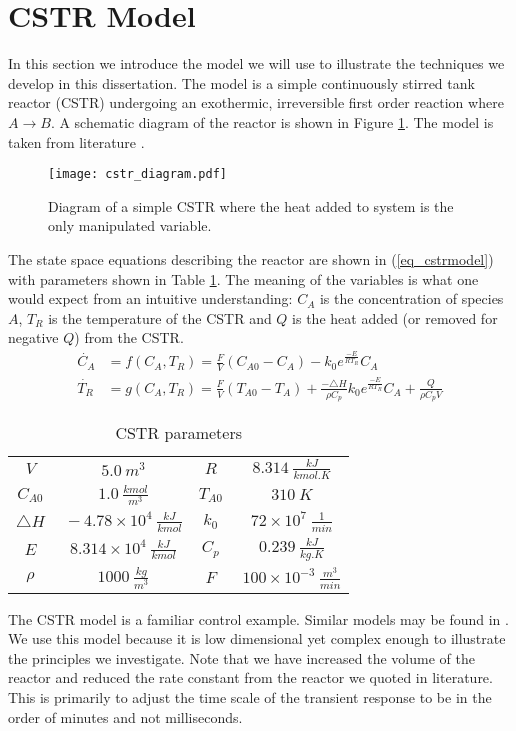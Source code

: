 \section{CSTR Model}
\label{sec_cstr}
In this section we introduce the model we will use to illustrate the techniques we develop in this dissertation. The model is a simple continuously stirred tank reactor (CSTR) undergoing an exothermic, irreversible first order reaction where $A \rightarrow B$. A schematic diagram of the reactor is shown in Figure \ref{fig_cstr_diagram}. The model is taken from literature \cite{cstrmodel}.
\begin{figure}[H] 
\centering
\texttt{[image: cstr\_diagram.pdf]}
\caption{Diagram of a simple CSTR where the heat added to system is the only manipulated variable.}
\label{fig_cstr_diagram}
\end{figure}
The state space equations describing the reactor are shown in (\ref{eq_cstrmodel}) with parameters shown in Table \ref{tab_params}. The meaning of the variables is what one would expect from an intuitive understanding: $C_A$ is the concentration of species $A$, $T_R$ is the temperature of the CSTR and $Q$ is the heat added (or removed for negative $Q$) from the CSTR.
\begin{equation}
\begin{aligned}
\dot{C_A} &= f(C_A, T_R) =  \frac{F}{V}\left( C_{A0}-C_A \right) - k_0e^{\frac{-E}{RT_R}}C_A \\
\dot{T_R} &= g(C_A, T_R) = \frac{F}{V}\left(T_{A0}-T_A\right) + \frac{-\triangle H}{\rho C_p}k_0e^{\frac{-E}{RT_R}}C_A + \frac{Q}{\rho C_p V}
\end{aligned}
\label{eq_cstrmodel}
\end{equation}
\begin{table}[H]
\begin{center}
\begin{tabular}{c c c c}
\hline
$V$ & $~5.0~m^3$ & $R$ & $~8.314~\frac{kJ}{kmol.K}$ \\
$C_{A0}$ & $~1.0~\frac{kmol}{m^3}$ &$T_{A0}$ & $~310~K$ \\
$\triangle H$ & $~-4.78\times 10^{4}~\frac{kJ}{kmol}$ & $k_{0}$ & $~72\times 10^{7}~\frac{1}{min}$ \\
$E$ & $~8.314\times 10^4~\frac{kJ}{kmol}$ & $C_{p}$ & $~0.239~\frac{kJ}{kg.K}$ \\
$\rho$ & $~1000~\frac{kg}{m^3}$ & 
$F$ & $~100\times 10^{-3}~\frac{m^3}{min}$ \\
\hline
\end{tabular}
\caption{CSTR parameters}
\label{tab_params}
\end{center}
\end{table}
The CSTR model is a familiar control example. Similar models may be found in \cite{du}\cite{cervantes}\cite{pan}\cite{yazdi}. We use this model because it is low dimensional yet complex enough to illustrate the principles we investigate. Note that we have increased the volume of the reactor and reduced the rate constant from the reactor we quoted in literature. This is primarily to adjust the time scale of the transient response to be in the order of minutes and not milliseconds.

